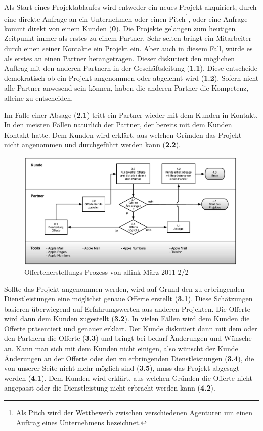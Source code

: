 Als Start eines Projektablaufes wird entweder ein neues Projekt akquiriert, 
durch eine direkte Anfrage an ein Unternehmen oder einen Pitch\footnote{Als Pitch 
wird der Wettbewerb zwischen verschiedenen Agenturen um einen Auftrag eines 
Unternehmens bezeichnet.}, oder eine Anfrage kommt direkt von einem Kunden (\textbf{0}). 
Die Projekte gelangen zum heutigen Zeitpunkt immer als erstes zu einem Partner. 
Sehr selten bringt ein Mitarbeiter durch einen seiner Kontakte ein Projekt ein. 
Aber auch in diesem Fall, würde es als erstes an einen Partner herangetragen.
Dieser diskutiert den möglichen Auftrag mit den anderen Partnern in der 
Geschäftsleitung (\textbf{1.1}). Diese entscheide demokratisch ob ein Projekt 
angenommen oder abgelehnt wird (\textbf{1.2}). Sofern nicht alle Partner anwesend 
sein können, haben die anderen Partner die Kompetenz, alleine zu entscheiden.

Im Falle einer Absage (\textbf{2.1}) tritt ein Partner wieder mit dem Kunden in Kontakt.
In den meisten Fällen natürlich der Partner, der bereits mit dem Kunden Kontakt
hatte. Dem Kunden wird erklärt, aus welchen Gründen das Projekt nicht angenommen
und durchgeführt werden kann (\textbf{2.2}).

\begin{figure}[htbp]
\begin{center}
\includegraphics[width=0.99\textwidth,angle=0]{./bilder/analyse/01_ist_prozesse_offerte_02.pdf}
\caption{Offertenerstellungs Prozess von allink März 2011 2/2}
\label{pic:01_ist_prozesse_offerte_02}
\end{center}
\end{figure}

Sollte das Projekt angenommen werden, wird auf Grund den zu erbringenden
Dienstleistungen eine möglichst genaue Offerte erstellt (\textbf{3.1}). Diese Schätzungen
basieren überwiegend auf Erfahrungswerten aus anderen Projekten.
Die Offerte wird dann dem Kunden zugestellt (\textbf{3.2}). In vielen Fällen wird dem Kunden
die Offerte präsentiert und genauer erklärt.
Der Kunde diskutiert dann mit dem oder den Partnern die Offerte (\textbf{3.3}) und bringt
bei bedarf Änderungen und Wünsche an.
Kann man sich mit dem Kunden nicht einigen, also wünscht der Kunde Änderungen
an der Offerte oder den zu erbringenden Dienstleistungen (\textbf{3.4}), die von unserer Seite
nicht mehr möglich sind (\textbf{3.5}), muss das Projekt abgesagt werden (\textbf{4.1}).
Dem Kunden wird erklärt, aus welchen Gründen die Offerte nicht angepasst oder
die Dienstleistung nicht erbracht werden kann (\textbf{4.2}).

